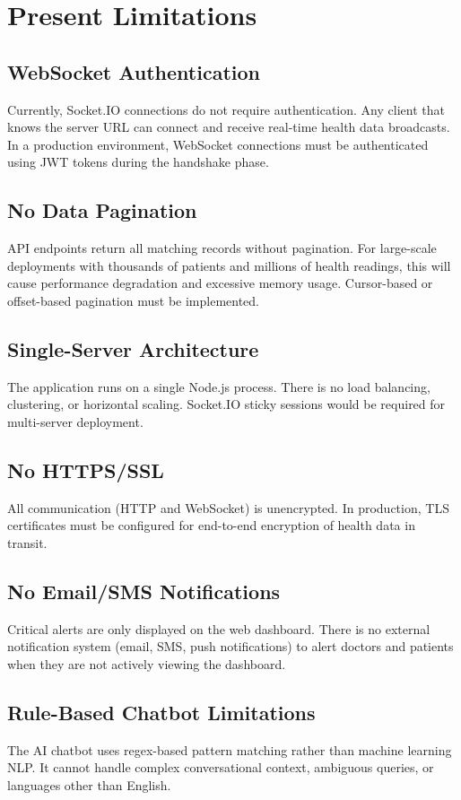 \documentclass[12pt,a4paper]{report}
\begin{document}
\section{Present Limitations}

\subsection{WebSocket Authentication}
Currently, Socket.IO connections do not require authentication. Any client that knows the server URL can connect and receive real-time health data broadcasts. In a production environment, WebSocket connections must be authenticated using JWT tokens during the handshake phase.

\subsection{No Data Pagination}
API endpoints return all matching records without pagination. For large-scale deployments with thousands of patients and millions of health readings, this will cause performance degradation and excessive memory usage. Cursor-based or offset-based pagination must be implemented.

\subsection{Single-Server Architecture}
The application runs on a single Node.js process. There is no load balancing, clustering, or horizontal scaling. Socket.IO sticky sessions would be required for multi-server deployment.

\subsection{No HTTPS/SSL}
All communication (HTTP and WebSocket) is unencrypted. In production, TLS certificates must be configured for end-to-end encryption of health data in transit.

\subsection{No Email/SMS Notifications}
Critical alerts are only displayed on the web dashboard. There is no external notification system (email, SMS, push notifications) to alert doctors and patients when they are not actively viewing the dashboard.

\subsection{Rule-Based Chatbot Limitations}
The AI chatbot uses regex-based pattern matching rather than machine learning NLP. It cannot handle complex conversational context, ambiguous queries, or languages other than English.
\end{document}
